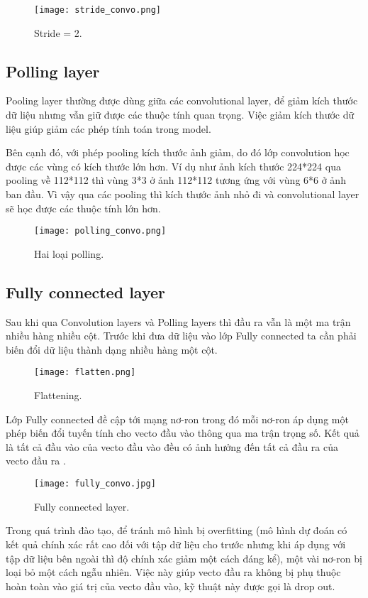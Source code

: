 \begin{figure}[h!]
	\centering
	\texttt{[image: stride\_convo.png]}
	\caption{Stride = 2.}
\end{figure} 

\subsection{Polling layer}
Pooling layer thường được dùng giữa các convolutional layer, để giảm kích thước dữ liệu nhưng vẫn giữ được các thuộc tính quan trọng. Việc giảm kích thước dữ liệu giúp giảm các phép tính toán
trong model.

Bên cạnh đó, với phép pooling kích thước ảnh giảm, do đó lớp convolution học được các vùng có kích thước lớn hơn. Ví dụ như ảnh kích thước 224*224 qua pooling về 112*112 thì vùng 3*3 ở ảnh 112*112 tương ứng với vùng 6*6 ở ảnh ban đầu. Vì vậy qua các pooling thì kích thước ảnh nhỏ đi và convolutional layer sẽ học được các thuộc tính lớn hơn.

\begin{figure}[h!]
	\centering
	\texttt{[image: polling\_convo.png]}
	\caption{Hai loại polling.}
\end{figure} 

\newpage
\subsection{Fully connected layer}
Sau khi qua Convolution layers và Polling layers thì đầu ra vẫn là một ma trận nhiều hàng nhiều cột. Trước khi đưa dữ liệu vào lớp Fully connected ta cần phải biến đổi dữ liệu thành dạng nhiều hàng một cột.

\begin{figure}[h!]
	\centering
	\texttt{[image: flatten.png]}
	\caption{Flattening.}
\end{figure} 

Lớp Fully connected đề cập tới mạng nơ-ron trong đó mỗi nơ-ron áp dụng một phép biến đổi tuyến tính cho vecto đầu vào thông qua ma trận trọng số. Kết quả là tất cả đầu vào của vecto đầu vào đều có ảnh hưởng đến tất cả đầu ra của vecto đầu ra \cite{web:3}.

\begin{figure}[h!]
	\centering
	\texttt{[image: fully\_convo.jpg]}
	\caption{Fully connected layer.}
\end{figure} 

Trong quá trình đào tạo, để tránh mô hình bị overfitting (mô hình dự đoán có kết quả chính xác rất cao đối với tập dữ liệu cho trước nhưng khi áp dụng với tập dữ liệu bên ngoài thì độ chính xác giảm một cách đáng kể), một vài nơ-ron bị loại bỏ một cách ngẫu nhiên. Việc này giúp vecto đầu ra không bị phụ thuộc hoàn toàn vào giá trị của vecto đầu vào, kỹ thuật này được gọi là drop out.

